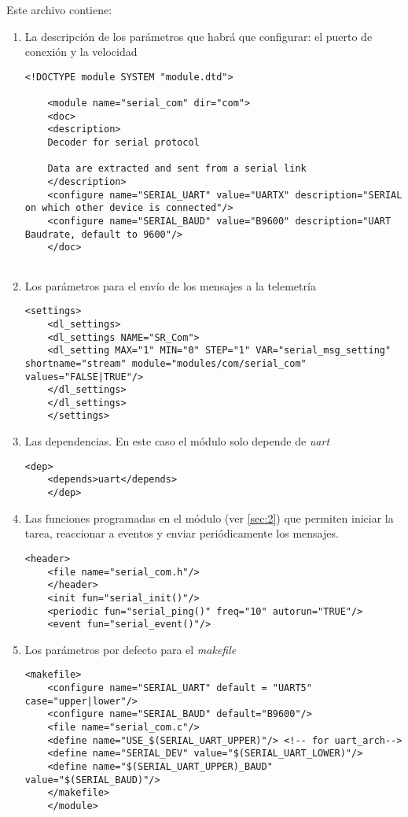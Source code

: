 Este archivo contiene:
\begin{enumerate}
	\item La descripción de los parámetros que habrá que configurar: el puerto de conexión y la velocidad
	\begin{lstlisting}[style=XML]
	<!DOCTYPE module SYSTEM "module.dtd">
	
	<module name="serial_com" dir="com">
	<doc>
	<description>
	Decoder for serial protocol
	
	Data are extracted and sent from a serial link 
	</description>
	<configure name="SERIAL_UART" value="UARTX" description="SERIAL on which other device is connected"/>
	<configure name="SERIAL_BAUD" value="B9600" description="UART Baudrate, default to 9600"/>
	</doc>
	
	\end{lstlisting}
	
	\item Los parámetros para el envío de los mensajes a la telemetría
		\begin{lstlisting}[style=XML]
	<settings>
	<dl_settings>
	<dl_settings NAME="SR_Com">
	<dl_setting MAX="1" MIN="0" STEP="1" VAR="serial_msg_setting" shortname="stream" module="modules/com/serial_com" values="FALSE|TRUE"/>
	</dl_settings>
	</dl_settings>
	</settings>
		\end{lstlisting}
	
	\item Las dependencias. En este caso el módulo solo depende de \textit{uart}
		\begin{lstlisting}[style=XML]
	<dep>
	<depends>uart</depends>
	</dep>
		\end{lstlisting}
	
	\item Las funciones programadas en el módulo (ver \ref{sec:2}) que permiten iniciar la tarea, reaccionar a eventos y enviar periódicamente los mensajes.
		\begin{lstlisting}[style=XML]
	<header>
	<file name="serial_com.h"/>
	</header>
	<init fun="serial_init()"/>
	<periodic fun="serial_ping()" freq="10" autorun="TRUE"/>
	<event fun="serial_event()"/>
	\end{lstlisting}
	
	\item Los parámetros por defecto para el \textit{makefile}
	
	\begin{lstlisting}[style=XML]
	<makefile>
	<configure name="SERIAL_UART" default = "UART5" case="upper|lower"/>
	<configure name="SERIAL_BAUD" default="B9600"/>
	<file name="serial_com.c"/>
	<define name="USE_$(SERIAL_UART_UPPER)"/> <!-- for uart_arch-->
	<define name="SERIAL_DEV" value="$(SERIAL_UART_LOWER)"/>
	<define name="$(SERIAL_UART_UPPER)_BAUD" value="$(SERIAL_BAUD)"/>
	</makefile>
	</module>
	\end{lstlisting}

\end{enumerate}


